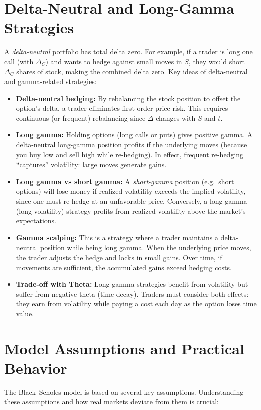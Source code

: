 \section{Delta-Neutral and Long-Gamma Strategies}
A \emph{delta-neutral} portfolio has total delta zero.  For example, if a trader is long one call (with \(\Delta_C\)) and wants to hedge against small moves in \(S\), they would short \(\Delta_C\) shares of stock, making the combined delta zero.  Key ideas of delta-neutral and gamma-related strategies:
\begin{itemize}
    \item \textbf{Delta-neutral hedging:}  By rebalancing the stock position to offset the option's delta, a trader eliminates first-order price risk. This requires continuous (or frequent) rebalancing since \(\Delta\) changes with \(S\) and \(t\).
    \item \textbf{Long gamma:} Holding options (long calls or puts) gives positive gamma. A delta-neutral long-gamma position profits if the underlying moves (because you buy low and sell high while re-hedging). In effect, frequent re-hedging ``captures'' volatility: large moves generate gains.
    \item \textbf{Long gamma vs short gamma:} A \emph{short-gamma} position (e.g.\ short options) will lose money if realized volatility exceeds the implied volatility, since one must re-hedge at an unfavorable price. Conversely, a long-gamma (long volatility) strategy profits from realized volatility above the market's expectations.
    \item \textbf{Gamma scalping:}  This is a strategy where a trader maintains a delta-neutral position while being long gamma. When the underlying price moves, the trader adjusts the hedge and locks in small gains. Over time, if movements are sufficient, the accumulated gains exceed hedging costs.
    \item \textbf{Trade-off with Theta:} Long-gamma strategies benefit from volatility but suffer from negative theta (time decay). Traders must consider both effects: they earn from volatility while paying a cost each day as the option loses time value.
\end{itemize}

\section{Model Assumptions and Practical Behavior}
The Black--Scholes model is based on several key assumptions.  Understanding these assumptions and how real markets deviate from them is crucial:

